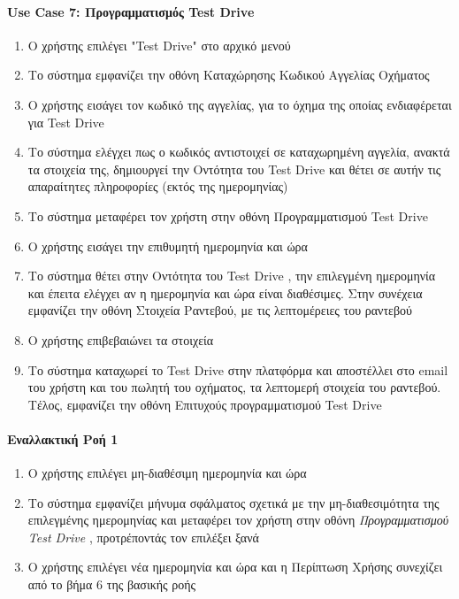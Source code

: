 \documentclass{../ol-softwaremanual}
\begin{document}
	
	\newpage
	\centering
	\paragraph{\en Use Case 7: \gr Προγραμματισμός \en Test Drive \gr}
	
	\begin{enumerate}
	\item Ο χρήστης επιλέγει \en"Test Drive" \gr στο αρχικό μενού
	\item Το σύστημα εμφανίζει την οθόνη Καταχώρησης Κωδικού Αγγελίας Οχήματος
	\item Ο χρήστης εισάγει τον κωδικό της αγγελίας, για το όχημα της οποίας ενδιαφέρεται για \en Test Drive \gr
	\item Το σύστημα ελέγχει πως ο κωδικός αντιστοιχεί σε καταχωρημένη αγγελία, ανακτά τα στοιχεία της,  
	δημιουργεί την Οντότητα του \en Test Drive \gr και θέτει σε αυτήν τις απαραίτητες πληροφορίες (εκτός της ημερομηνίας)
	\item Το σύστημα μεταφέρει τον χρήστη στην οθόνη Προγραμματισμού \en Test Drive \gr 
	\item Ο χρήστης εισάγει την επιθυμητή ημερομηνία και ώρα		
	\item Το σύστημα θέτει στην Οντότητα του \en Test Drive \gr, την επιλεγμένη ημερομηνία και έπειτα ελέγχει αν η ημερομηνία και ώρα είναι διαθέσιμες. Στην συνέχεια εμφανίζει την οθόνη Στοιχεία Ραντεβού, με τις λεπτομέρειες του ραντεβού
	\item Ο χρήστης επιβεβαιώνει τα στοιχεία
	\item Το σύστημα καταχωρεί το \en Test Drive \gr στην πλατφόρμα και αποστέλλει στο \en email \gr του χρήστη και του πωλητή του οχήματος, τα λεπτομερή στοιχεία του ραντεβού. Τέλος, εμφανίζει την οθόνη Επιτυχούς προγραμματισμού \en Test Drive \gr 
\end{enumerate}
	
	\paragraph{Εναλλακτική Ροή 1}
	
	\begin{enumerate}
		\item Ο χρήστης επιλέγει μη-διαθέσιμη ημερομηνία και ώρα
		\item Το σύστημα εμφανίζει μήνυμα σφάλματος σχετικά με την μη-διαθεσιμότητα της επιλεγμένης ημερομηνίας και μεταφέρει τον χρήστη στην οθόνη \textit{Προγραμματισμού \en Test Drive \gr}, προτρέποντάς τον επιλέξει ξανά
		\item Ο χρήστης επιλέγει νέα ημερομηνία και ώρα και η Περίπτωση Χρήσης συνεχίζει από το βήμα 6 της βασικής ροής
	\end{enumerate}
	
\end{document}
